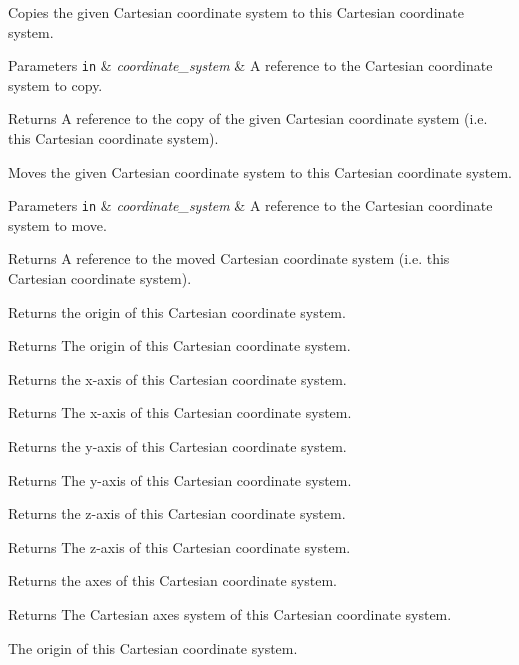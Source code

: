 Copies the given Cartesian coordinate system to this Cartesian coordinate system.


\begin{DoxyParams}[1]{Parameters}
\mbox{\tt in}  & {\em coordinate\+\_\+system} & A reference to the Cartesian coordinate system to copy. \\
\hline
\end{DoxyParams}
\begin{DoxyReturn}{Returns}
A reference to the copy of the given Cartesian coordinate system (i.\+e. this Cartesian coordinate system).
\end{DoxyReturn}
Moves the given Cartesian coordinate system to this Cartesian coordinate system.


\begin{DoxyParams}[1]{Parameters}
\mbox{\tt in}  & {\em coordinate\+\_\+system} & A reference to the Cartesian coordinate system to move. \\
\hline
\end{DoxyParams}
\begin{DoxyReturn}{Returns}
A reference to the moved Cartesian coordinate system (i.\+e. this Cartesian coordinate system).
\end{DoxyReturn}
Returns the origin of this Cartesian coordinate system.

\begin{DoxyReturn}{Returns}
The origin of this Cartesian coordinate system.
\end{DoxyReturn}
Returns the x-\/axis of this Cartesian coordinate system.

\begin{DoxyReturn}{Returns}
The x-\/axis of this Cartesian coordinate system.
\end{DoxyReturn}
Returns the y-\/axis of this Cartesian coordinate system.

\begin{DoxyReturn}{Returns}
The y-\/axis of this Cartesian coordinate system.
\end{DoxyReturn}
Returns the z-\/axis of this Cartesian coordinate system.

\begin{DoxyReturn}{Returns}
The z-\/axis of this Cartesian coordinate system.
\end{DoxyReturn}
Returns the axes of this Cartesian coordinate system.

\begin{DoxyReturn}{Returns}
The Cartesian axes system of this Cartesian coordinate system.
\end{DoxyReturn}
The origin of this Cartesian coordinate system.


